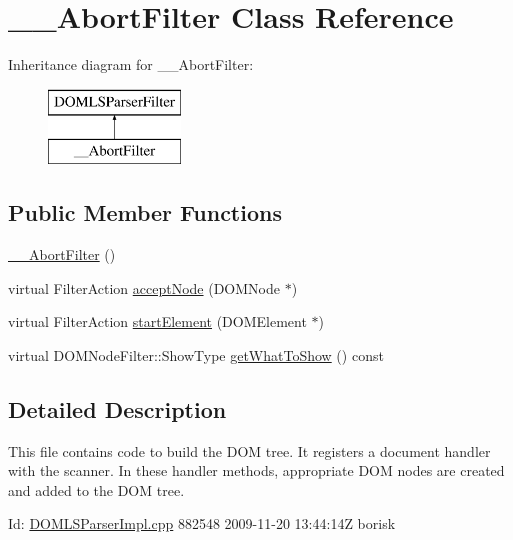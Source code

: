 \hypertarget{class____AbortFilter}{\section{\-\_\-\-\_\-\-Abort\-Filter Class Reference}
\label{class____AbortFilter}
}
Inheritance diagram for \-\_\-\-\_\-\-Abort\-Filter\-:\begin{figure}[H]
\begin{center}
\leavevmode
\includegraphics[height=2.000000cm]{class____AbortFilter}
\end{center}
\end{figure}
\subsection*{Public Member Functions}
\begin{DoxyCompactItemize}
\item 
\hyperlink{class____AbortFilter_aedd2e31de7493afed9784c4ceb40fcd0}{\-\_\-\-\_\-\-Abort\-Filter} ()
\item 
virtual Filter\-Action \hyperlink{class____AbortFilter_ae170a99b0f3d4077643871c0b4489e8e}{accept\-Node} (D\-O\-M\-Node $\ast$)
\item 
virtual Filter\-Action \hyperlink{class____AbortFilter_a9e85549ed00396bb0286d6014f215445}{start\-Element} (D\-O\-M\-Element $\ast$)
\item 
virtual D\-O\-M\-Node\-Filter\-::\-Show\-Type \hyperlink{class____AbortFilter_a97b8ff4fe3fcf4e5e3114c038867c5e4}{get\-What\-To\-Show} () const 
\end{DoxyCompactItemize}


\subsection{Detailed Description}
This file contains code to build the D\-O\-M tree. It registers a document handler with the scanner. In these handler methods, appropriate D\-O\-M nodes are created and added to the D\-O\-M tree.

\begin{DoxyParagraph}{Id\-:}
\hyperlink{DOMLSParserImpl_8cpp}{D\-O\-M\-L\-S\-Parser\-Impl.\-cpp} 882548 2009-\/11-\/20 13\-:44\-:14\-Z borisk 
\end{DoxyParagraph}


